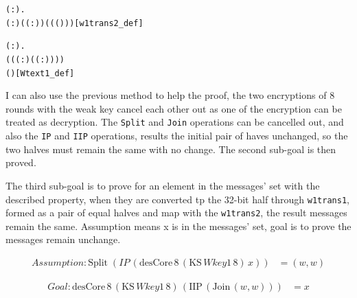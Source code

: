 \documentclass{article}
\begin{document}
\begin{alltt}
\HOLTokenTurnstile{} \HOLSymConst{\HOLTokenForall{}}( :).
       \HOLSymConst{=}
      ( :) (  ( :)) ( ( (\HOLSymConst{,})))\hfill{[w1trans2_def]}
\end{alltt}

\begin{alltt}
\HOLTokenTurnstile{}  \HOLSymConst{=}
   \HOLTokenLeftbrace{} \HOLTokenBar{}
    \HOLSymConst{\HOLTokenExists{}}( :).
       ( ( ( :) (  ( :)) )) \HOLSymConst{=}
      (\HOLSymConst{,})\HOLTokenRightbrace{}\hfill{[Wtext1_def]}
\end{alltt}

I can also use the previous method to help the proof, the two encryptions of 8 rounds with the weak key cancel each other out
as one of the encryption can be treated as decryption. The \verb|Split| and \verb|Join| operations can be cancelled out, and also the
\verb|IP| and \verb|IIP| operations, results the initial pair of haves unchanged, so the two halves must remain the same with no change.
The second sub-goal is then proved.

The third sub-goal is to prove for an element in the messages' set with the described property, when they are converted
tp the 32-bit half through \verb|w1trans1|, formed as a pair of equal halves and map with the \verb|w1trans2|, the result messages
remain the same. Assumption means x is in the messages' set, goal is to prove the messages remain unchange.

\begin{equation*}
\begin{split}
 Assumption: \text{Split} \; (IP \,(\text{desCore} \,8 \,(\text{KS} \,Wkey1 \,8) \,x)) &= (w, w)
\end{split}
\end{equation*}

\begin{equation*}
\begin{split}
 Goal: \text{desCore} \,8 \,(\text{KS} \,Wkey1 \,8) \,(\text{IIP} \,(\text{Join} \,(w, w))) &= x
\end{split}
\end{equation*}
\end{document}
